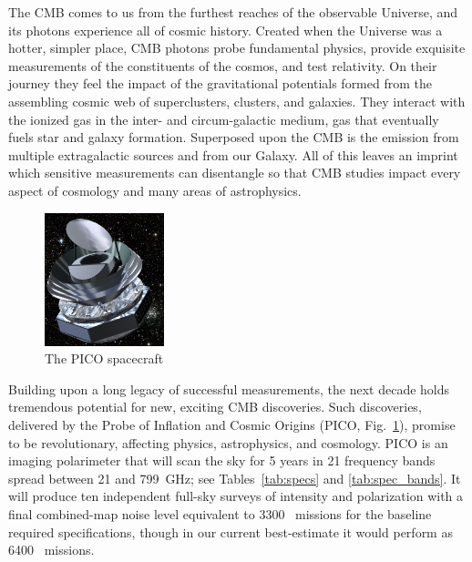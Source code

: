 \documentclass[PICOReport.tex]{subfiles}
\begin{document}

The \ac{CMB} comes to us from the furthest reaches of the observable Universe, and its photons experience all of cosmic history.  Created when the Universe was a hotter, simpler place, CMB photons probe fundamental physics, provide exquisite measurements of the constituents of the cosmos, and test relativity.  On their journey they feel the impact of the gravitational potentials formed from the assembling cosmic web of superclusters, clusters, and galaxies.  They interact with the ionized gas in the inter- and circum-galactic medium, gas that eventually fuels star and galaxy formation.  Superposed upon the CMB is the emission from multiple extragalactic sources and from our Galaxy.  All of this leaves an imprint which sensitive measurements can disentangle so that CMB studies impact every aspect of cosmology and many areas of astrophysics.

\begin{figure}  %
\vspace{-5pt} %
\includegraphics[width=0.31\textwidth]{images/PICO_Image.jpg}
\vspace{-0.25in}
\caption{\captiontext The PICO spacecraft 
\label{fig:pico_rendered} }
\end{figure}

Building upon a long legacy of successful measurements, the next decade holds tremendous potential for new, exciting \ac{CMB} discoveries.  Such discoveries, delivered by the Probe of Inflation and Cosmic Origins (PICO, Fig.~\ref{fig:pico_rendered}), promise to be revolutionary, affecting physics, astrophysics, and cosmology. PICO is an imaging polarimeter that will scan the sky for 5 years in 21 frequency bands spread between 21 and 799~GHz; see Tables~\ref{tab:specs} and \ref{tab:spec_bands}. It will produce ten independent full-sky surveys of intensity and polarization with a final combined-map noise level equivalent to 3300 \planck\ missions for the baseline required specifications, though in our current best-estimate it would perform as 6400 \planck\ missions.  
\end{document}
